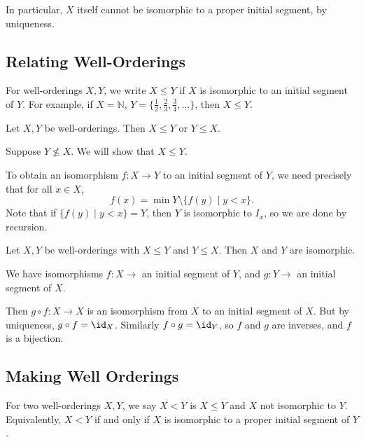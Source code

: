 \documentclass[12pt]{article}
\begin{document}
In particular, $X$ itself cannot be isomorphic to a proper initial segment, by uniqueness.

\subsection{Relating Well-Orderings}
\label{sub:relating_well_orderings}

For well-orderings $X, Y$, we write $X \leq Y$ if $X$ is isomorphic to an initial segment of $Y$. For example, if $X = \mathbb{N}$, $Y = \{\frac{1}{2}, \frac{2}{3}, \frac{3}{4}, \ldots\}$, then $X \leq Y$.

\begin{proposition}
	Let $X, Y$ be well-orderings. Then $X \leq Y$ or $Y \leq X$.
\end{proposition}

\begin{proofbox}
	Suppose $Y \not \leq X$. We will show that $X \leq Y$.

	To obtain an isomorphism $f : X \to Y$ to an initial segment of $Y$, we need precisely that for all $x \in X$,
	\[
		f(x) = \min Y \setminus \{f(y) \mid y < x\}
	.\]
	Note that if $\{f(y) \mid y < x\} = Y$, then $Y$ is isomorphic to $I_x$, so we are done by recursion.
\end{proofbox}

\begin{proposition}
	Let $X, Y$ be well-orderings with $X \leq Y$ and $Y \leq X$. Then $X$ and $Y$ are isomorphic.
\end{proposition}

\begin{proofbox}
	We have isomorphisms $f : X \to$ an initial segment of $Y$, and $g : Y \to$ an initial segment of $X$.

	Then $g \circ f : X \to X$ is an isomorphism from $X$ to an initial segment of $X$. But by uniqueness, $g \circ f = \id_X$. Similarly $f \circ g = \id_Y$, so $f$ and $g$ are inverses, and $f$ is a bijection.
\end{proofbox}

\subsection{Making Well Orderings}
\label{sub:making_well_orderings}

For two well-orderings $X, Y$, we say $X < Y$ is $X \leq Y$ and $X$ not isomorphic to $Y$. Equivalently, $X < Y$ if and only if $X$ is isomorphic to a proper initial segment of $Y$.
\end{document}
